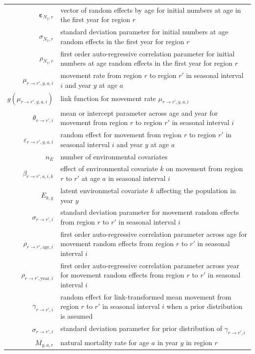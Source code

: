 \documentclass[
]{article}
\begin{document}
\begin{longtable}[c]{r p{}}
$\boldsymbol{\varepsilon}_{N_1,r}$ & vector of random effects by age for initial numbers at age in the first year for region $r$\\ 
$\sigma_{N_1,r}$ & standard deviation parameter for initial numbers at age random effects in the first year for region $r$\\
$\rho_{N_1,r}$ & first order auto-regressive correlation parameter for initial numbers at age random effects in the first year for region $r$\\
$\mu_{r\rightarrow r',y,a,i}$ & movement rate from region $r$ to region $r'$ in seasonal interval $i$ and year $y$ at age $a$\\
$g(\mu_{r\rightarrow r',y,a,i})$ & link function for movement rate $\mu_{r\rightarrow r',y,a,i}$\\
$\theta_{r\rightarrow r',i}$ & mean or intercept parameter across age and year for movement from region $r$ to region $r'$ in seasonal interval $i$\\
$\varepsilon_{r\rightarrow r',y,a,i}$ & random effect for movement from region $r$ to region $r'$ in seasonal interval $i$ and year $y$ at age $a$\\
$n_E$ & number of environmental covariates\\
$\beta_{r \rightarrow r',a,i,k}$ & effect of environmental covariate $k$ on movement from region $r$ to $r'$ at age $a$ in seasonal interval $i$\\
$E_{k,y}$ & latent environmetal covariate $k$ affecting the population in year $y$\\
$\sigma_{r \rightarrow r',i}$ & standard deviation parameter for movement random effects from region $r$ to $r'$ in seasonal interval $i$\\
$\rho_{r \rightarrow r',\text{age},i}$ & first order auto-regressive correlation parameter across age for movement random effects from region $r$ to $r'$ in seasonal interval $i$\\
$\rho_{r \rightarrow r',\text{year},i}$ & first order auto-regressive correlation parameter across year for movement random effects from region $r$ to $r'$ in seasonal interval $i$\\
$\gamma_{r\rightarrow r',i}$ & random effect for link-transformed mean movement from region $r$ to $r'$ in seasonal interval $i$ when a prior distribution is assumed\\
$\sigma_{r\rightarrow r',i}$ & standard deviation parameter for prior distribution of $\gamma_{r\rightarrow r',i}$\\
$M_{y,a,r}$ & natural mortality rate for age $a$ in year $y$ in region $r$\\

\end{longtable}
\end{document}

